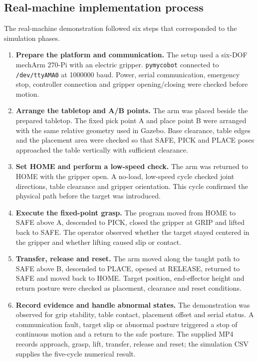 \documentclass[11pt,a4paper]{article}
\newcommand{\code}[1]{\texttt{\footnotesize #1}}
\begin{document}
\subsection{Real-machine implementation process}
The real-machine demonstration followed six steps that corresponded to the simulation phases.
\begin{enumerate}
\item \textbf{Prepare the platform and communication.} The setup used a six-DOF mechArm 270-Pi with an electric gripper. \code{pymycobot} connected to \code{/dev/ttyAMA0} at 1000000 baud. Power, serial communication, emergency stop, controller connection and gripper opening/closing were checked before motion.
\item \textbf{Arrange the tabletop and A/B points.} The arm was placed beside the prepared tabletop. The fixed pick point A and place point B were arranged with the same relative geometry used in Gazebo. Base clearance, table edges and the placement area were checked so that SAFE, PICK and PLACE poses approached the table vertically with sufficient clearance.
\item \textbf{Set HOME and perform a low-speed check.} The arm was returned to HOME with the gripper open. A no-load, low-speed cycle checked joint directions, table clearance and gripper orientation. This cycle confirmed the physical path before the target was introduced.
\item \textbf{Execute the fixed-point grasp.} The program moved from HOME to SAFE above A, descended to PICK, closed the gripper at GRIP and lifted back to SAFE. The operator observed whether the target stayed centered in the gripper and whether lifting caused slip or contact.
\item \textbf{Transfer, release and reset.} The arm moved along the taught path to SAFE above B, descended to PLACE, opened at RELEASE, returned to SAFE and moved back to HOME. Target position, end-effector height and return posture were checked as placement, clearance and reset conditions.
\item \textbf{Record evidence and handle abnormal states.} The demonstration was observed for grip stability, table contact, placement offset and serial status. A communication fault, target slip or abnormal posture triggered a stop of continuous motion and a return to the safe posture. The supplied MP4 records approach, grasp, lift, transfer, release and reset; the simulation CSV supplies the five-cycle numerical result.
\end{enumerate}
\end{document}
